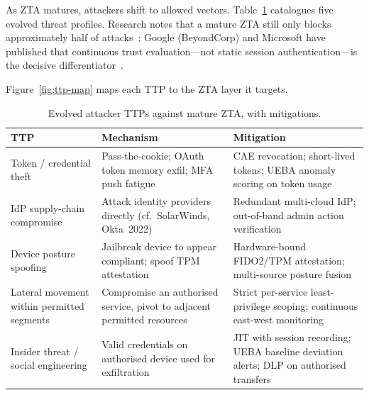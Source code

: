 \documentclass[sigconf,nonacm]{acmart}
\begin{document}
As ZTA matures, attackers shift to allowed vectors.  Table~\ref{tab:ttps}
catalogues five evolved threat profiles.  Research notes that a mature
ZTA still only blocks approximately half of attacks~\cite{darkreading2024};
Google (BeyondCorp) and Microsoft have published that continuous trust
evaluation---not static session authentication---is the decisive
differentiator~\cite{msft2024}.

Figure~\ref{fig:ttp-map} maps each TTP to the ZTA layer it targets.

\begin{table}[t]
\caption{Evolved attacker TTPs against mature ZTA, with mitigations.}
\label{tab:ttps}
\small
\setlength{\tabcolsep}{5pt}
\begin{tabularx}{\textwidth}{@{}
  p{3.2cm}   %
  p{5.0cm}   %
  X          %
@{}}
\toprule
\textbf{TTP} & \textbf{Mechanism} & \textbf{Mitigation} \\
\midrule
Token / credential theft
  & Pass-the-cookie; OAuth token memory exfil; MFA push fatigue
  & CAE revocation; short-lived tokens; UEBA anomaly scoring on token usage \\
\addlinespace[3pt]
IdP supply-chain compromise
  & Attack identity providers directly (cf.\ SolarWinds, Okta~2022)
  & Redundant multi-cloud IdP; out-of-band admin action verification \\
\addlinespace[3pt]
Device posture spoofing
  & Jailbreak device to appear compliant; spoof TPM attestation
  & Hardware-bound FIDO2/TPM attestation; multi-source posture fusion \\
\addlinespace[3pt]
Lateral movement within permitted segments
  & Compromise an authorised service, pivot to adjacent permitted resources
  & Strict per-service least-privilege scoping; continuous east-west monitoring \\
\addlinespace[3pt]
Insider threat / social engineering
  & Valid credentials on authorised device used for exfiltration
  & JIT with session recording; UEBA baseline deviation alerts; DLP on authorised transfers \\
\bottomrule
\end{tabularx}
\end{table}
\end{document}
